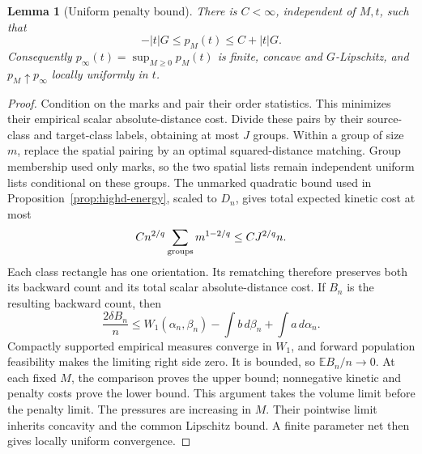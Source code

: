 \documentclass[11pt,reqno]{amsart}
\newtheorem{lemma}[theorem]{Lemma}
\theoremstyle{definition}
\theoremstyle{remark}
\numberwithin{equation}{section}
\newcommand{\E}{\mathbb E}
\begin{document}
\begin{lemma}[Uniform penalty bound]
\label{forward-full-penalty-bound}
There is \(C<\infty\), independent of \(M,t\), such that
\[
 -|t|G\le p_M(t)\le C+|t|G.
\]
Consequently \(p_\infty(t)=\sup_{M\ge0}p_M(t)\) is finite,
concave and \(G\)-Lipschitz, and \(p_M\uparrow p_\infty\)
locally uniformly in \(t\).
\end{lemma}
\begin{proof}
Condition on the marks and pair their order statistics. This minimizes
their empirical scalar absolute-distance cost. Divide these pairs by their
source-class and target-class labels, obtaining at most \(J\) groups.
Within a group of size \(m\), replace the spatial pairing by an optimal
squared-distance matching. Group membership used only marks, so the two
spatial lists remain independent uniform lists conditional on these groups.
The unmarked quadratic bound used in
Proposition~\ref{prop:highd-energy}, scaled to \(D_n\), gives total
expected kinetic cost at most
\[
 C n^{2/q}\sum_{\rm groups}m^{1-2/q}
          \le C J^{2/q}n.
\]
Each class rectangle has one orientation. Its rematching therefore preserves
both its backward count and its total scalar absolute-distance cost. If
\(B_n\) is the resulting backward count, then
\[
 \frac{2\delta B_n}{n}
 \le W_1(\alpha_n,\beta_n)
       -\int b\,d\beta_n+\int a\,d\alpha_n.
\]
Compactly supported empirical measures converge in \(W_1\), and forward
population feasibility makes the limiting right side zero. It is bounded,
so \(\E B_n/n\to0\). At each fixed \(M\), the comparison proves
the upper bound; nonnegative kinetic and penalty costs prove the lower
bound. This argument takes the volume limit before the penalty limit.
The pressures are increasing in \(M\). Their pointwise limit inherits
concavity and the common Lipschitz bound. A finite parameter net then gives
locally uniform convergence.
\end{proof}
\end{document}
